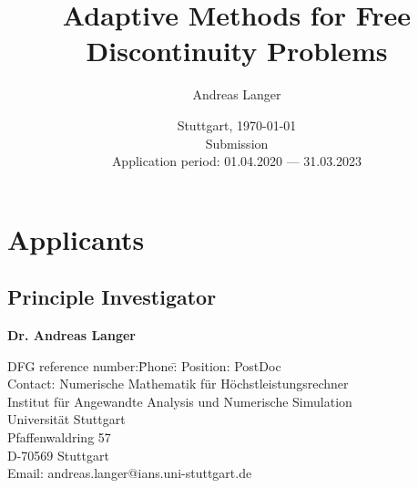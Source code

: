 \documentclass[enabledeprecatedfontcommands,cleardoublepage=empty,headsepline,twoside,11pt,DIV=15,BCOR=12mm,final]{scrartcl}
\begin{document}
\begin{titlepage}\sffamily
  \subject{DFG Research Grant Application} 
  \title{Adaptive Methods for Free Discontinuity Problems}%
  
  \author{Andreas Langer}
  \date{Stuttgart, \today \\[50mm] Submission\\[50mm]
    Application period: 01.04.2020 --- 31.03.2023}
\end{titlepage}

\maketitle[-1]
\cleardoublepage
\setcounter{page}{1}
\pagestyle{scrheadings}


\section*{Applicants}

\subsection*{Principle Investigator}

\begin{flushleft}
  \textbf{Dr. Andreas Langer}
  \begin{tabbing}
    DFG reference number:\quad\=Phone:\quad\=\kill
    Position:\>  PostDoc\\
    Contact:\> Numerische Mathematik f\"ur H\"ochstleistungsrechner\\ 
    \>Institut f\"ur Angewandte Analysis und Numerische Simulation\\
    \> Universit\"at Stuttgart\\
    \> Pfaffenwaldring 57 \\
    \> D-70569 Stuttgart\\[1mm]
    \> Email:\> andreas.langer@ians.uni-stuttgart.de\\[1mm]
 \end{tabbing}
\end{flushleft}


\end{document}
